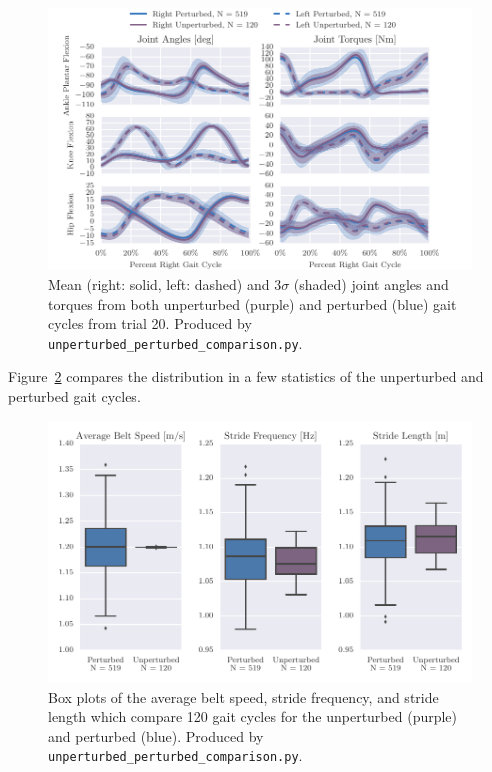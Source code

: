 \documentclass[fleqn,10pt]{wlpeerj}
\begin{document}
\begin{figure}
  \centering
  \includegraphics{figures/unperturbed-perturbed-comparison.pdf}
  \cprotect\caption{Mean (right: solid, left: dashed) and $3\sigma$ (shaded)
    joint angles and torques from both unperturbed (purple) and perturbed
    (blue) gait cycles from trial 20. Produced by \verb|unperturbed_perturbed_comparison.py|.}
  \label{fig:angle-torque-comparison}
\end{figure}

Figure~\ref{fig:gait-cycle-stats-comparison} compares the distribution in a few
statistics of the unperturbed and perturbed gait cycles.

\begin{figure}
  \centering
  \includegraphics{figures/unperturbed-perturbed-boxplot-comparison.pdf}
  \cprotect\caption{Box plots of the average belt speed, stride frequency, and
    stride length which compare 120 gait cycles for the unperturbed (purple) and
    perturbed (blue). Produced by \verb|unperturbed_perturbed_comparison.py|.}
  \label{fig:gait-cycle-stats-comparison}
\end{figure}
\end{document}
